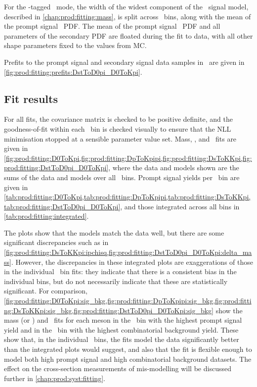 For the \PDstarp-tagged \DzToKpi\ mode, the width of the widest component of 
the \deltam\ signal model, described in \cref{chap:prod:fitting:mass}, is split 
across \pTy\ bins, along with the mean of the prompt signal \lnipchisq\ 
\ac{PDF}.
The mean of the prompt signal \lnipchisq\ \ac{PDF} and all parameters of the 
secondary \ac{PDF} are floated during the fit to data, with all other shape 
parameters fixed to the values from \ac{MC}.

Prefits to the prompt signal and secondary signal data samples in \PDzero 
\lnipchisq\ are given in \cref{fig:prod:fitting:prefits:DstToD0pi_D0ToKpi}.

\subsection{Fit results}
\label{chap:prod:fitting:results}

For all fits, the covariance matrix is checked to be positive definite, and the 
goodness-of-fit within each \pTy\ bin is checked visually to ensure that the 
\ac{NLL} minimisation stopped at a sensible parameter value set.
Mass, \deltam, and \lnipchisq\ fits are given in 
\cref{fig:prod:fitting:D0ToKpi,fig:prod:fitting:DpToKpipi,fig:prod:fitting:DsToKKpi,fig:prod:fitting:DstToD0pi_D0ToKpi}, 
where the data and models shown are the sums of the data and models over all 
\pTy\ bins.
Prompt signal yields per \pTy\ bin are given in 
\cref{tab:prod:fitting:D0ToKpi,tab:prod:fitting:DpToKpipi,tab:prod:fitting:DsToKKpi,tab:prod:fitting:DstToD0pi_D0ToKpi}, 
and those integrated across all bins in \cref{tab:prod:fitting:integrated}.

The plots show that the models match the data well, but there are some 
significant discrepancies such as in 
\cref{fig:prod:fitting:DsToKKpi:ipchisq,fig:prod:fitting:DstToD0pi_D0ToKpi:delta_mass}.
However, the discrepancies in these integrated plots are exaggerations of those 
in the individual \pTy\ bin fits: they indicate that there is a consistent bias 
in the individual bins, but do not necessarily indicate that these are 
statistically significant.
For comparison, 
\cref{fig:prod:fitting:D0ToKpi:sig_bkg,fig:prod:fitting:DpToKpipi:sig_bkg,fig:prod:fitting:DsToKKpi:sig_bkg,fig:prod:fitting:DstToD0pi_D0ToKpi:sig_bkg} 
show the mass (or \deltam) and \lnipchisq\ fits for each meson in the \pTy\ bin 
with the highest prompt signal yield and in the \pTy\ bin with the highest 
combinatorial background yield.
These show that, in the individual \pTy\ bins, the fits model the data 
significantly better than the integrated plots would suggest, and also that the 
fit is flexible enough to model both high prompt signal and high combinatorial 
background datasets.
The effect on the cross-section measurements of mis-modelling will be discussed 
further in \cref{chap:prod:syst:fitting}.

